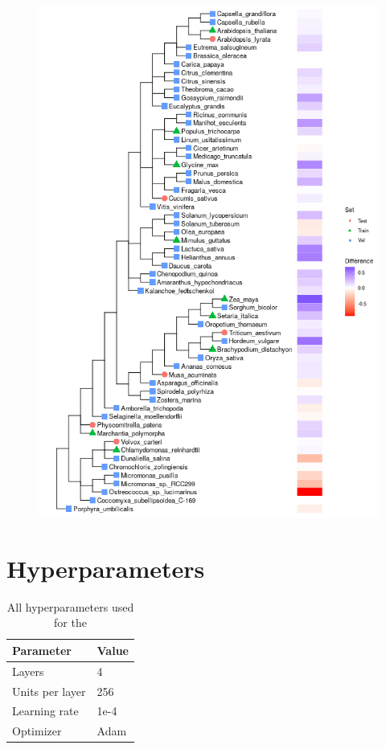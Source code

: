 \documentclass{article}
\begin{document}
\begin{figure}[!h]
\centerline{\includegraphics[width=1.0\textwidth]{images/plants_differences}}
\end{figure}



\clearpage
\section{Hyperparameters}

\begin{table}[!h]
\renewcommand\thetable{S1}
\centering
\begin{tabular}{@{}ll@{}}
\hline
Parameter & Value \\ [0.5ex]
\hline
Layers & 4\\
Units per layer & 256\\
Learning rate & 1e-4\\
Optimizer & Adam\\
\hline
\end{tabular}
\caption{All hyperparameters used for the }
\label{suptab:params}
\end{table}
\end{document}
